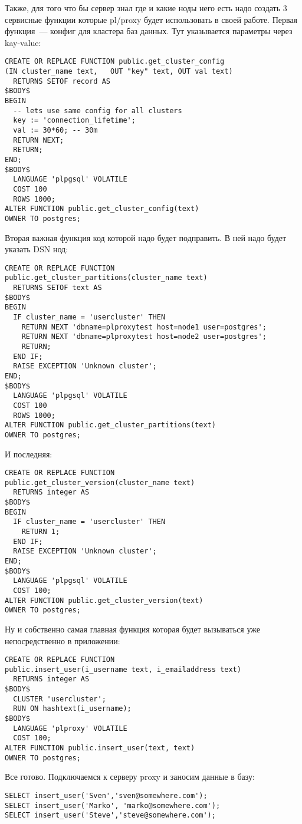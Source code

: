 Также, для того что бы сервер знал где и какие ноды него есть надо создать 
3 сервисные функции которые pl/proxy будет использовать в своей работе. 
Первая функция~--- конфиг для кластера баз данных. Тут указывается параметры через kay-value:
\begin{verbatim}
CREATE OR REPLACE FUNCTION public.get_cluster_config
(IN cluster_name text,   OUT "key" text, OUT val text)
  RETURNS SETOF record AS
$BODY$
BEGIN
  -- lets use same config for all clusters
  key := 'connection_lifetime';
  val := 30*60; -- 30m
  RETURN NEXT;
  RETURN;
END;
$BODY$
  LANGUAGE 'plpgsql' VOLATILE
  COST 100
  ROWS 1000;
ALTER FUNCTION public.get_cluster_config(text) 
OWNER TO postgres;  
\end{verbatim}

Вторая важная функция код которой надо будет подправить. В ней надо будет указать DSN нод:
\begin{verbatim}
СREATE OR REPLACE FUNCTION 
public.get_cluster_partitions(cluster_name text)
  RETURNS SETOF text AS
$BODY$
BEGIN
  IF cluster_name = 'usercluster' THEN
    RETURN NEXT 'dbname=plproxytest host=node1 user=postgres';
    RETURN NEXT 'dbname=plproxytest host=node2 user=postgres';
    RETURN;
  END IF;
  RAISE EXCEPTION 'Unknown cluster';
END;
$BODY$
  LANGUAGE 'plpgsql' VOLATILE
  COST 100
  ROWS 1000;
ALTER FUNCTION public.get_cluster_partitions(text) 
OWNER TO postgres;
\end{verbatim}

И последняя:
\begin{verbatim}
CREATE OR REPLACE FUNCTION 
public.get_cluster_version(cluster_name text)
  RETURNS integer AS
$BODY$
BEGIN
  IF cluster_name = 'usercluster' THEN
    RETURN 1;
  END IF;
  RAISE EXCEPTION 'Unknown cluster';
END;
$BODY$
  LANGUAGE 'plpgsql' VOLATILE
  COST 100;
ALTER FUNCTION public.get_cluster_version(text) 
OWNER TO postgres;
\end{verbatim}

Ну и собственно самая главная функция которая будет вызываться уже непосредственно в приложении:
\begin{verbatim}
CREATE OR REPLACE FUNCTION 
public.insert_user(i_username text, i_emailaddress text)
  RETURNS integer AS
$BODY$
  CLUSTER 'usercluster';
  RUN ON hashtext(i_username);
$BODY$
  LANGUAGE 'plproxy' VOLATILE
  COST 100;
ALTER FUNCTION public.insert_user(text, text) 
OWNER TO postgres;
\end{verbatim}

Все готово. Подключаемся к серверу proxy и заносим данные в базу:
\begin{verbatim}
SELECT insert_user('Sven','sven@somewhere.com');
SELECT insert_user('Marko', 'marko@somewhere.com');
SELECT insert_user('Steve','steve@somewhere.com');
\end{verbatim}

